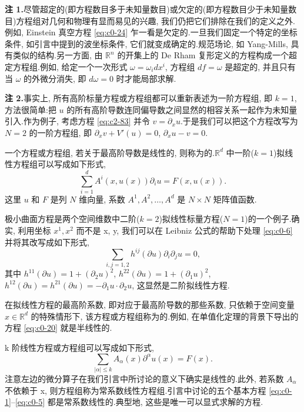 \noindent\textbf{注 1.}\quad 尽管超定的(即方程数目多于未知量数目)或欠定的(即方程数目少于未知量数目)方程组对几何和物理有显而易见的兴趣, 我们仍把它们排除在我们的定义之外.例如, Einstein 真空方程 \eqref{eq:c0-24} 乍一看是欠定的.一旦我们固定一个特定的坐标条件, 如引言中提到的波坐标条件, 它们就变成确定的.规范场论, 如 Yang-Mills, 具有类似的结构.另一方面, 由 $\mathbb{R}^{n}$ 的开集上的 De Rham 复形定义的方程构成一个超定方程组.例如, 给定一个一次形式 $\omega = \omega_{i} dx^{i}$, 方程组 $df = \omega$ 是超定的, 并且只有当 $\omega$ 的外微分消失, 即 $d\omega = 0$ 时才能局部求解.

\noindent\textbf{注 2.}\quad 事实上, 所有高阶标量方程或方程组都可以重新表述为一阶方程组, 即 $k = 1$, 方法很简单:把 $u$ 的所有高阶导数连同偏导数之间显然的相容关系一起作为未知量引入.作为例子, 考虑方程 \eqref{eq:c2-83} 并令 $v = \partial_{x} u$.于是我们可以把这个方程改写为 $N = 2$ 的一阶方程组, 即 $\partial_{x} v + V'(u) = 0$, $\partial_{x} u - v = 0$.

一个方程或方程组, 若关于最高阶导数是线性的, 则称为的.$\mathbb{R}^{d}$ 中一阶($k = 1$)拟线性方程组可以写成如下形式,
\begin{equation}
\sum_{i = 1}^{d} A^{i}(x, u(x)) \partial_{i} u = F(x, u(x)). \label{eq:c2-86}
\end{equation}
这里 $u$ 和 $F$ 是列 $N$ 维向量, 系数 $A^{1}, A^{2}, \ldots, A^{d}$ 是 $N \times N$ 矩阵值函数.

极小曲面方程是两个空间维数中二阶($k = 2$)拟线性标量方程($N = 1$)的一个例子.确实, 利用坐标 $x^{1}, x^{2}$ 而不是 x, y, 我们可以在 Leibniz 公式的帮助下处理 \eqref{eq:c0-6} 并将其改写成如下形式,
\begin{equation}
\sum_{i, j = 1, 2} h^{ij}(\partial u) \partial_{i} \partial_{j} u = 0, \label{eq:c2-87}
\end{equation}
其中
$h^{11}(\partial u) = 1 + (\partial_{2} u)^{2}$, $h^{22}(\partial u) = 1 + (\partial_{1} u)^{2}$, $h^{12}(\partial u) = h^{21}(\partial u) = -\partial_{1} u \cdot \partial_{2} u$,
这显然是二阶拟线性方程.

在拟线性方程的最高阶系数, 即对应于最高阶导数的那些系数, 只依赖于空间变量 $x \in \mathbb{R}^{d}$ 的特殊情形下, 该方程或方程组称为的.例如, 在单值化定理的背景下导出的方程 \eqref{eq:c0-20} 就是半线性的.

k 阶线性方程或方程组可以写成如下形式,
\begin{equation}
\sum_{|\alpha| \leq k} A_{\alpha}(x) \partial^{\alpha} u(x) = F(x). \label{eq:c2-88}
\end{equation}
注意左边的微分算子在我们引言中所讨论的意义下确实是线性的.此外, 若系数 $A_{\alpha}$ 不依赖于 x, 则方程组称为常系数线性方程组.引言中讨论的五个基本方程 \eqref{eq:c0-1}–\eqref{eq:c0-5} 都是常系数线性的.典型地, 这些是唯一可以显式求解的方程.

